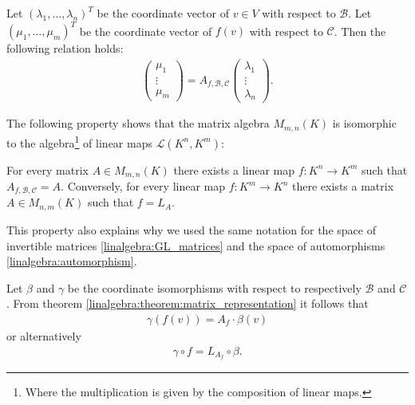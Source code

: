     \begin{property}\label{linalgebra:theorem:matrix_representation}
        Let $(\lambda_1,\ldots,\lambda_n)^T$ be the coordinate vector of $v\in V$ with respect to $\mathcal{B}$. Let $(\mu_1, \ldots, \mu_m)^T$ be the coordinate vector of $f(v)$ with respect to $\mathcal{C}$. Then the following relation holds:
        \begin{gather}
            \left(
            \begin{array}{c}
                \mu_1\\
                \vdots\\
                \mu_m
            \end{array}\right)
            = A_{f, \mathcal{B}, \mathcal{C}}
            \left(
            \begin{array}{c}
                \lambda_1\\
                \vdots\\
                \lambda_n
            \end{array}\right).
        \end{gather}
    \end{property}

    The following property shows that the matrix algebra $M_{m, n}(K)$ is isomorphic to the algebra\footnote{Where the multiplication is given by the composition of linear maps.} of linear maps $\mathcal{L}(K^n, K^m)$:
    \begin{property}\label{linalgebra:theorem:map_matrix_link}
        For every matrix $A\in M_{m,n}(K)$ there exists a linear map $f:K^n\rightarrow K^m$ such that $A_{f, \mathcal{B}, \mathcal{C}} = A$. Conversely, for every linear map $f:K^m\rightarrow K^n$ there exists a matrix $A\in M_{n,m}(K)$ such that $f=L_A$.
    \end{property}
    \begin{remark}
        This property also explains why we used the same notation for the space of invertible matrices \ref{linalgebra:GL_matrices} and the space of automorphisms \ref{linalgebra:automorphism}.
    \end{remark}

    \begin{property}
        Let $\beta$ and $\gamma$ be the coordinate isomorphisms with respect to respectively $\mathcal{B}$ and $\mathcal{C}$. From theorem \ref{linalgebra:theorem:matrix_representation} it follows that
        \begin{gather}
            \gamma(f(v)) = A_f\cdot\beta(v)
        \end{gather}
        or alternatively
        \begin{gather}
            \gamma\circ f = L_{A_f}\circ\beta.
        \end{gather}
    \end{property}

